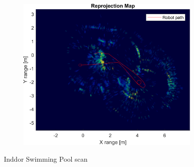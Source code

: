 \begin{figure}[htbp]
\begin{subfigure}[t]{0.475\linewidth}
    \end{subfigure}\bigskip\\
    \begin{subfigure}[t]{0.5\linewidth}
        \centering
        \includegraphics[width=\linewidth,max height=.475\textheight]{gfx/results/indoorswimmingpool_reprojection.png}
    \end{subfigure}%
    \caption{Inddor Swimming Pool scan}
\end{figure}

